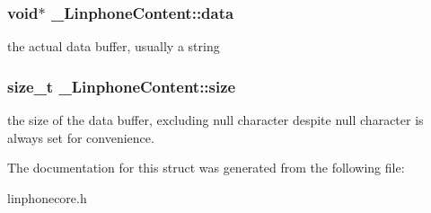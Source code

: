 \subsubsection[{data}]{\setlength{\rightskip}{0pt plus 5cm}void$\ast$ \-\_\-\-Linphone\-Content\-::data}\label{struct__LinphoneContent_a086b012e35d02be9c68c8f0fd4661f39}
the actual data buffer, usually a string 
\subsubsection[{size}]{\setlength{\rightskip}{0pt plus 5cm}size\-\_\-t \-\_\-\-Linphone\-Content\-::size}\label{struct__LinphoneContent_a6ea21723404888691dbe0aaa547ec4cb}
the size of the data buffer, excluding null character despite null character is always set for convenience. 

The documentation for this struct was generated from the following file\-:\begin{DoxyCompactItemize}
\item 
linphonecore.\-h\end{DoxyCompactItemize}
